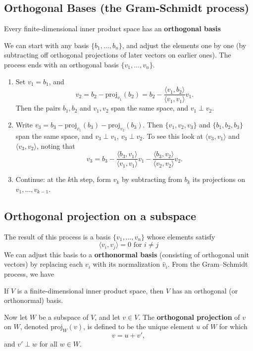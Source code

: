 \documentclass[a4paper, 9pt]{extarticle}
\begin{document}
\subsection{Orthogonal Bases (the Gram-Schmidt process)}
\begin{conceptbox}{}{}
  Every finite-dimensional inner product space has an \textbf{orthogonal basis}
\end{conceptbox}
\noindent We can start with any basis $\{b_1, \dots, b_n\}$, and adjust the elements one by one (by subtracting off orthogonal projections of later vectors on earlier ones). The process ends with an orthogonal basis $\{v_1, \dots, v_n\}$.

\begin{enumerate}
  \item Set $v_1 = b_1$, and
        \[
          v_2 = b_2 - \text{proj}_{v_1}(b_2) = b_2 - \frac{\langle v_1, b_2 \rangle}{\langle v_1, v_1 \rangle} v_1.
        \]
        Then the pairs $b_1, b_2$ and $v_1, v_2$ span the same space, and $v_1 \perp v_2$.

  \item Write $v_3 = b_3 - \text{proj}_{v_1}(b_3) - \text{proj}_{v_2}(b_3)$.
        Then $\{v_1, v_2, v_3\}$ and $\{b_1, b_2, b_3\}$ span the same space, and $v_3 \perp v_1$, $v_3 \perp v_2$. To see this look at $\langle v_3, v_1 \rangle$ and $\langle v_3, v_2 \rangle$, noting that
        \[
          v_3 = b_3 - \frac{\langle b_3, v_1 \rangle}{\langle v_1, v_1 \rangle} v_1 - \frac{\langle b_3, v_2 \rangle}{\langle v_2, v_2 \rangle} v_2.
        \]

  \item Continue: at the $k$th step, form $v_k$ by subtracting from $b_k$ its projections on $v_1, \dots, v_{k-1}$.
\end{enumerate}
\subsection{Orthogonal projection on a subspace}
The result of this process is a basis $\{v_1, \dots, v_n\}$ whose elements satisfy
$$
  \langle v_i, v_j \rangle = 0 \text{ for } i \ne j
$$
We can adjust this basis to a \textbf{orthonormal basis} (consisting of orthogonal unit vectors) by replacing each $v_i$ with its normalization $\hat{v}_i$.
From the Gram–Schmidt process, we have

\begin{theorembox}{}{}
  If $V$ is a finite-dimensional inner product space, then $V$ has an orthogonal (or orthonormal) basis.
\end{theorembox}
Now let $W$ be a subspace of $V$, and let $v \in V$. The \textbf{orthogonal projection} of $v$ on $W$, denoted $\text{proj}_W(v)$, is defined to be the unique element $u$ of $W$ for which
$$
  v = u + v',
$$
and $v' \perp w$ for all $w \in W$.
\end{document}
